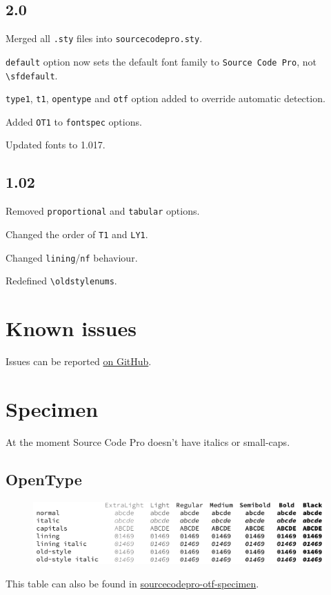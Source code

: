 \documentclass[10pt,a4paper,english]{article}
\newcommand*\file[1]{\href{run:#1.pdf}{#1}}
\begin{document}
\begin{multicols}{2}
\subsection*{2.0}
\begin{itemize*}
	\item Merged all \texttt{.sty} files into \texttt{sourcecodepro.sty}.
	\item \texttt{default} option now sets the default font family to \texttt{Source Code Pro}, not \texttt{\textbackslash sfdefault}.
	\item \texttt{type1}, \texttt{t1}, \texttt{opentype} and \texttt{otf} option added to override automatic detection.
	\item Added \texttt{OT1} to \texttt{fontspec} options.
	\item Updated fonts to 1.017.
\end{itemize*}

\subsection*{1.02}
\begin{itemize*}
	\item Removed \texttt{proportional} and \texttt{tabular} options.
	\item Changed the order of \texttt{T1} and \texttt{LY1}.
	\item Changed \texttt{lining}/\texttt{nf} behaviour.
	\item Redefined \texttt{\textbackslash oldstylenums}.
\end{itemize*}

\section{Known issues}
Issues can be reported \href{https://github.com/silkeh/latex-sourcecodepro/issues}{on GitHub}.


\newpage
\end{multicols}

\section{Specimen}
At the moment Source Code Pro doesn’t have italics or small-caps.
\label{sec:specimen}
\subsection{OpenType}
\begin{figure}[ht]
	\centering
	\includegraphics[width=\linewidth]{sourcecodepro-otf-specimen}
\end{figure}
This table can also be found in \file{sourcecodepro-otf-specimen}.
\end{document}
